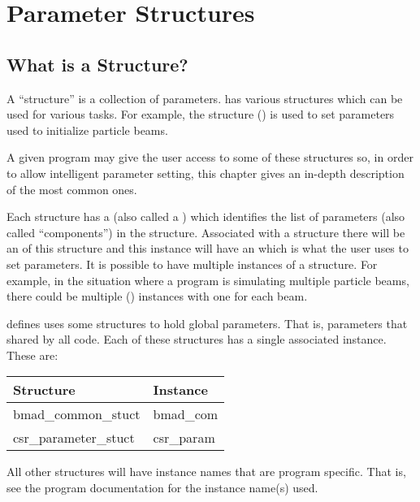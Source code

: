 \chapter{Parameter Structures}
\label{c:param.structs}

\section{What is a Structure?}
\label{s:struct}

A ``structure'' is a collection of parameters.  \bmad has various structures which can be used for
various tasks. For example, the  structure () is used
to set parameters used to initialize particle beams.

A given program may give the user access to some of these structures so, in order to allow
intelligent parameter setting, this chapter gives an in-depth description of the most common ones.

Each structure has a  (also called a ) which identifies the
list of parameters (also called ``components'') in the structure. Associated with a structure there
will be an  of this structure and this instance will have an 
which is what the user uses to set parameters. It is possible to have multiple instances of a
structure. For example, in the situation where a program is simulating multiple particle beams,
there could be multiple  () instances with one for
each beam.

\bmad defines uses some structures to hold global parameters. That is, parameters that shared by all
code. Each of these structures has a single associated instance. These are:
\begin{center}
  \begin{tabular}{ll} \toprule
  Structure           & Instance    \\
  \midrule
  bmad_common_stuct   & bmad_com    \\
  csr_parameter_stuct & csr_param   \\
  \bottomrule
  \end{tabular}
\end{center}
All other structures will have instance names that are program specific. That is, see the program
documentation for the instance name(s) used.


